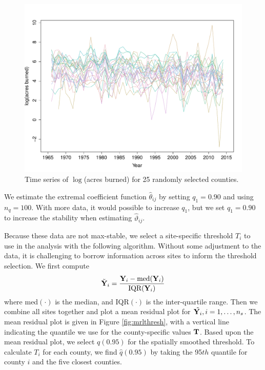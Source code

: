 \documentclass[11pt]{article}
\begin{document}
\begin{figure}[htbp]
  \centering
  \includegraphics[width=0.80\linewidth]{plots/spag-rand-25}
  \caption{Time series of $\log$(acres burned) for 25 randomly selected counties.}
  \label{fig:firets25}
\end{figure}

We estimate the extremal coefficient function $\hat{\theta}_{ij}$ by setting $q_1 = 0.90$ and using $n_q = 100$.
With more data, it would possible to increase $q_1$, but we set $q_1 = 0.90$ to increase the stability when estimating $\hat{\vartheta}_{ij}$.

Because these data are not max-stable, we select a site-specific threshold $T_i$ to use in the analysis with the following algorithm.
Without some adjustment to the data, it is challenging to borrow information across sites to inform the threshold selection.
We first compute
\begin{align}
  \tilde{\mbox{\bf Y}}_i = \frac{\mbox{\bf Y}_i - \text{med}(\mbox{\bf Y}_i)}{\text{IQR}(\mbox{\bf Y}_i)}
\end{align}
where med$(\cdot)$ is the median, and IQR$(\cdot)$ is the inter-quartile range.
Then we combine all sites together and plot a mean residual plot for $\tilde{\mbox{\bf Y}_i}, i = 1, \ldots, n_s$.
The mean residual plot is given in Figure \ref{fig:mrlthresh}, with a vertical line indicating the quantile we use for the county-specific values $\mbox{\bf T}$.
Based upon the mean residual plot, we select $q(0.95)$ for the spatially smoothed threshold.
To calculate $T_i$ for each county, we find $\hat{q}(0.95)$ by taking the 95$th$ quantile for county $i$ and the five closest counties.
\end{document}
